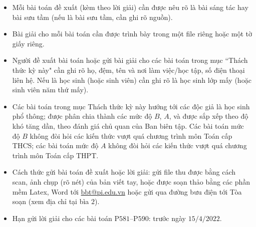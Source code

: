 \thispagestyle{thachthuctoanhocnone}
\pagestyle{thachthuctoanhoc}
\everymath{\color{thachthuctoanhoc}}
\graphicspath{{../thachthuctoanhoc/pic/}}
\begingroup
{}
\centering
\vspace*{4cm}
\endgroup
\vspace*{-8pt}
\begin{tBox}
	\begin{itemize}[leftmargin = 13pt, itemsep = 1.0pt] 
		\item Mỗi bài toán đề xuất (kèm theo lời giải) cần được nêu rõ là bài sáng tác hay bài sưu tầm (nếu là bài sưu tầm, cần ghi rõ nguồn).
		\item Bài giải cho mỗi bài toán cần được trình bày trong một file riêng hoặc
		một tờ giấy riêng.
		\item  Người đề xuất bài toán hoặc gửi bài giải cho các bài toán trong mục ``Thách thức kỳ này" cần ghi rõ họ, đệm, tên và nơi làm việc/học tập, số điện thoại liên hệ. Nếu là học sinh (hoặc sinh viên) cần ghi rõ là học sinh lớp mấy (hoặc sinh viên năm thứ mấy).
		\item Các bài toán trong mục Thách thức kỳ này hướng tới các độc giả là học sinh phổ thông; được phân chia thành các mức độ $B$, $A$, và được sắp xếp theo độ khó tăng dần, theo đánh giá chủ quan của Ban biên tập. Các bài toán mức độ $B$ không đòi hỏi các kiến thức vượt quá chương trình môn Toán cấp THCS; các bài toán mức độ $A$ không đòi hỏi các kiến thức vượt quá chương trình môn Toán cấp THPT.
		\item Cách thức gửi bài toán đề xuất hoặc lời giải: gửi file thu được bằng cách scan, ảnh chụp (rõ nét) của bản viết tay, hoặc được soạn thảo bằng các phần mềm Latex, Word tới \url{bbt@pi.edu.vn} hoặc gửi qua đường bưu điện tới Tòa soạn (xem địa chỉ tại bìa $2$).
		\item Hạn gửi lời giải cho các bài toán P$581$--P$590$: trước ngày $15/4/2022$.
	\end{itemize}
\end{tBox}
